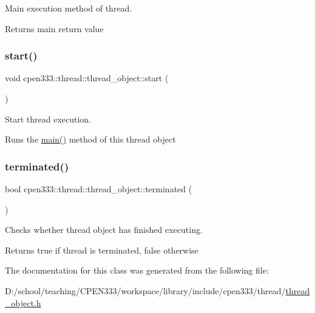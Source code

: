 Main execution method of thread. 

\begin{DoxyReturn}{Returns}
main return value 
\end{DoxyReturn}
\mbox{\label{classcpen333_1_1thread_1_1thread__object_ae4484909a3f4418c0c0db318d615bde1}} 
\subsubsection{\texorpdfstring{start()}{start()}}
{\footnotesize\ttfamily void cpen333\+::thread\+::thread\+\_\+object\+::start (\begin{DoxyParamCaption}{ }\end{DoxyParamCaption})\hspace{0.3cm}{\ttfamily [inline]}}



Start thread execution. 

Runs the \hyperlink{classcpen333_1_1thread_1_1thread__object_adbd74f6f7461d90a1c12e8078aa5f3af}{main()} method of this thread object \mbox{\label{classcpen333_1_1thread_1_1thread__object_a3f7f0eb9632797cbd86dc4b84f38baed}} 
\subsubsection{\texorpdfstring{terminated()}{terminated()}}
{\footnotesize\ttfamily bool cpen333\+::thread\+::thread\+\_\+object\+::terminated (\begin{DoxyParamCaption}{ }\end{DoxyParamCaption})\hspace{0.3cm}{\ttfamily [inline]}}



Checks whether thread object has finished executing. 

\begin{DoxyReturn}{Returns}
true if thread is terminated, false otherwise 
\end{DoxyReturn}


The documentation for this class was generated from the following file\+:\begin{DoxyCompactItemize}
\item 
D\+:/school/teaching/\+C\+P\+E\+N333/workspace/library/include/cpen333/thread/\hyperlink{thread__object_8h}{thread\+\_\+object.\+h}\end{DoxyCompactItemize}
